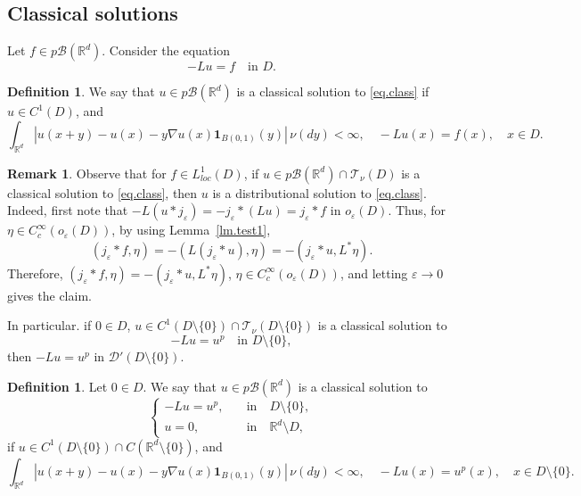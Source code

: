 \documentclass[11pt,a4paper,reqno]{amsart}
\theoremstyle{definition}
\newtheorem{definition}[theorem]{Definition}
\newtheorem{remark}[theorem]{Remark}
\numberwithin{equation}{section}
\begin{document}
\subsection{Classical solutions}

Let $f\in p\mathscr B(\mathbb R^d)$.
Consider the equation
\begin{equation}
\label{eq.class}
-Lu=f\quad\text{in }D.
\end{equation} 

\begin{definition}
We say that  $u\in p\mathscr B(\mathbb R^d)$ is a classical solution to 
\eqref{eq.class}  if $u\in C^1(D)$,
and 
\[
\int_{\mathbb R^d}|u(x+y)-u(x)-y\nabla u(x)\mathbf1_{B(0,1)}(y)|\,\nu(dy)<\infty,\quad -Lu(x)=f(x),\quad x\in D.
\]
\end{definition}

\begin{remark}
\label{rem.cldist}
Observe that for  $f\in L^1_{loc}(D)$,  if $u\in p\mathscr B(\mathbb R^d)\cap \mathscr T_\nu(D)$ is a classical solution to 
\eqref{eq.class}, then $u$ is a distributional solution to \eqref{eq.class}.
Indeed, first note that $-L(u\ast j_\varepsilon)=-j_\varepsilon\ast (Lu)=j_\varepsilon\ast f$ in $o_\varepsilon(D)$.
Thus, for $\eta\in C_c^\infty(o_\varepsilon(D))$, by using Lemma~\ref{lm.test1}, 
\[
(j_\varepsilon\ast f,\eta)=-(L(j_\varepsilon\ast u),\eta)= -(j_\varepsilon\ast u,L^*\eta).
\]
Therefore, $(j_\varepsilon\ast f,\eta)= -(j_\varepsilon\ast u,L^*\eta)$, $\eta\in C_c^\infty(o_\varepsilon(D))$,
and letting $\varepsilon\to 0$ gives the claim.

 In particular. if $0\in D$, $u\in C^1(D\setminus\{0\})\cap \mathscr T_\nu(D\setminus\{0\})$ is a classical solution to 
\[
-Lu=u^p\quad\text{in }D\setminus\{0\},
\] 
then $-Lu=u^p$ in $\mathscr D'(D\setminus\{0\})$.
\end{remark}


\begin{definition}
Let $0\in D$. We say that  $u\in p\mathscr B(\mathbb R^d)$ is a classical solution to 
\begin{equation}
\label{eq1.1class1}
\begin{cases}
-Lu=u^p,\quad &\text{in}\quad D\setminus\{0\}, \\
u=0,\quad &\text{in}\quad\mathbb{R}^d\setminus D,
\end{cases}
\end{equation}
if $u\in C^1(D\setminus\{0\})\cap C(\mathbb R^d\setminus\{0\})$,
and 
\[
\int_{\mathbb R^d}|u(x+y)-u(x)-y\nabla u(x)\mathbf1_{B(0,1)}(y)|\,\nu(dy)<\infty,\quad -Lu(x)=u^p(x),\quad x\in D\setminus\{0\}.
\]
\end{definition}
\end{document}
